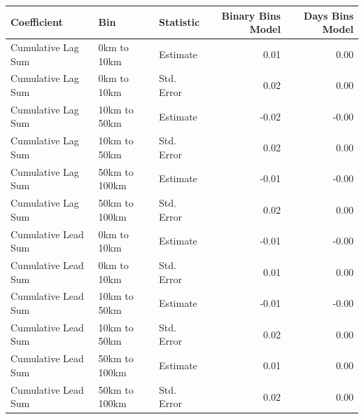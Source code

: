 \begin{table}[ht]
\centering
\begin{tabular}{lllrr}
  \toprule
Coefficient & Bin & Statistic & Binary Bins Model & Days Bins Model \\ 
  \midrule
Cumulative Lag Sum & 0km to 10km & Estimate & 0.01 & 0.00 \\ 
  Cumulative Lag Sum & 0km to 10km & Std. Error & 0.02 & 0.00 \\ 
  Cumulative Lag Sum & 10km to 50km & Estimate & -0.02 & -0.00 \\ 
  Cumulative Lag Sum & 10km to 50km & Std. Error & 0.02 & 0.00 \\ 
  Cumulative Lag Sum & 50km to 100km & Estimate & -0.01 & -0.00 \\ 
  Cumulative Lag Sum & 50km to 100km & Std. Error & 0.02 & 0.00 \\ 
  Cumulative Lead Sum & 0km to 10km & Estimate & -0.01 & -0.00 \\ 
  Cumulative Lead Sum & 0km to 10km & Std. Error & 0.01 & 0.00 \\ 
  Cumulative Lead Sum & 10km to 50km & Estimate & -0.01 & -0.00 \\ 
  Cumulative Lead Sum & 10km to 50km & Std. Error & 0.02 & 0.00 \\ 
  Cumulative Lead Sum & 50km to 100km & Estimate & 0.01 & 0.00 \\ 
  Cumulative Lead Sum & 50km to 100km & Std. Error & 0.02 & 0.00 \\ 
   \bottomrule
\end{tabular}
\end{table}
